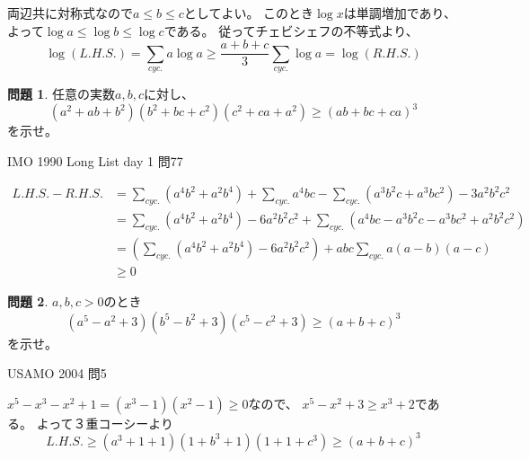 \documentclass[uplatex, a5paper]{jsarticle}
\makeatletter
\theoremstyle{definition}
\newtheorem{prob}{問題}
\renewenvironment{proof}[1][\proofname]{
  \pushQED{\qed}%
  \normalfont \topsep6\p@\@plus6\p@\relax
  \trivlist
  \item[\hskip\labelsep
    #1\@addpunct{\textbf{.}}]\ignorespaces
}{%
  \popQED\endtrivlist\@endpefalse
}
\providecommand{\proofname}{証明}
\newcommand{\lhs }{ L.H.S. }
\newcommand{\rhs }{ R.H.S. }
\def\qed{\hfill $\Box$}
\makeatother
\begin{document}
\begin{proof}
  両辺共に対称式なので\(a \leq b \leq c\)としてよい。
  このとき\(\log x\)は単調増加であり、
  よって\(\log a \leq \log b \leq \log c\)である。
  従ってチェビシェフの不等式より、
  \[
  \log ( \lhs ) = \sum_{cyc.} a\log a \geq \frac{a+b+c}{3}\sum_{cyc.}\log a = \log ( \rhs )
  \]
\end{proof}









\newpage

\begin{prob}
  任意の実数\(a,b,c\)に対し、
  \[
  (a^2+ab+b^2)(b^2+bc+c^2)(c^2+ca+a^2) \geq (ab+bc+ca)^3
  \]
  を示せ。
  \begin{flushright}
    IMO 1990 Long List day 1 問77
  \end{flushright}
\end{prob}



\begin{proof}
  \begin{align*}
    \lhs - \rhs
    &= \sum _{cyc.}(a^4b^2+a^2b^4) + \sum _{cyc.}a^4bc - \sum _{cyc.}(a^3b^2c+a^3bc^2) - 3a^2b^2c^2 \\
    &= \sum _{cyc.}(a^4b^2+a^2b^4) - 6a^2b^2c^2 + \sum _{cyc.}(a^4bc-a^3b^2c-a^3bc^2+a^2b^2c^2) \\
    &= \left( \sum _{cyc.}(a^4b^2+a^2b^4) - 6a^2b^2c^2 \right)
    + abc\sum _{cyc.}a(a-b)(a-c) \\
    &\geq 0
  \end{align*}
\end{proof}











\newpage

\begin{prob}
  \(a,b,c>0\)のとき
  \[
  (a^5-a^2+3)(b^5-b^2+3)(c^5-c^2+3) \geq (a+b+c)^3
  \]
  を示せ。
  \begin{flushright}
    USAMO 2004 問5
  \end{flushright}
\end{prob}



\begin{proof}
  \(x^5 -x^3 -x^2 +1 = ( x^3 -1 )( x^2 -1 ) \geq 0\)なので、
  \(x^5 -x^2 + 3 \geq x^3 +2\)である。
  よって３重コーシーより
  \[
  \lhs \geq ( a^3 +1 +1)(1+b^3+1)(1+1+c^3) \geq (a+b+c)^3
  \]
\end{proof}
\end{document}
